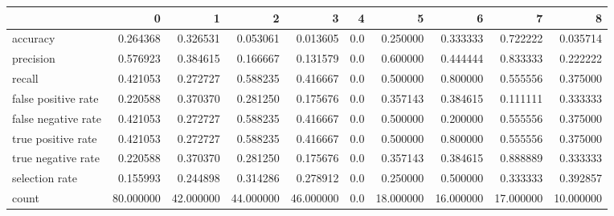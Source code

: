 \begin{tabular}{lrrrrrrrrr}
\toprule
{} &          0 &          1 &          2 &          3 &    4 &          5 &          6 &          7 &          8 \\
\midrule
accuracy            &   0.264368 &   0.326531 &   0.053061 &   0.013605 &  0.0 &   0.250000 &   0.333333 &   0.722222 &   0.035714 \\
precision           &   0.576923 &   0.384615 &   0.166667 &   0.131579 &  0.0 &   0.600000 &   0.444444 &   0.833333 &   0.222222 \\
recall              &   0.421053 &   0.272727 &   0.588235 &   0.416667 &  0.0 &   0.500000 &   0.800000 &   0.555556 &   0.375000 \\
false positive rate &   0.220588 &   0.370370 &   0.281250 &   0.175676 &  0.0 &   0.357143 &   0.384615 &   0.111111 &   0.333333 \\
false negative rate &   0.421053 &   0.272727 &   0.588235 &   0.416667 &  0.0 &   0.500000 &   0.200000 &   0.555556 &   0.375000 \\
true positive rate  &   0.421053 &   0.272727 &   0.588235 &   0.416667 &  0.0 &   0.500000 &   0.800000 &   0.555556 &   0.375000 \\
true negative rate  &   0.220588 &   0.370370 &   0.281250 &   0.175676 &  0.0 &   0.357143 &   0.384615 &   0.888889 &   0.333333 \\
selection rate      &   0.155993 &   0.244898 &   0.314286 &   0.278912 &  0.0 &   0.250000 &   0.500000 &   0.333333 &   0.392857 \\
count               &  80.000000 &  42.000000 &  44.000000 &  46.000000 &  0.0 &  18.000000 &  16.000000 &  17.000000 &  10.000000 \\
\bottomrule
\end{tabular}

